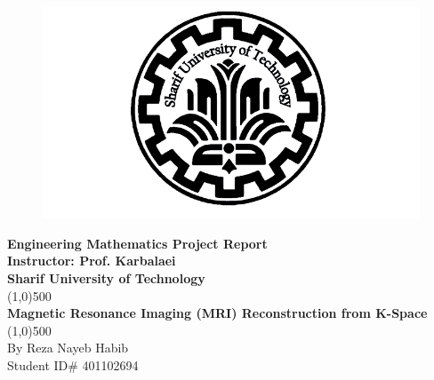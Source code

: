 \documentclass[11pt]{article}
\begin{document}
    
\begin{titlepage}
\begin{center}

\begin{figure}[H]
\begin{center}
\includegraphics[scale=0.4]{Fig/SUT.png}

\end{center}
\end{figure}

\huge{\textbf{Engineering Mathematics Project Report}} \\ 
\vspace*{2cm}
\Large{\textbf{Instructor: Prof. Karbalaei}} \\
\vspace*{1cm}
\huge{\textbf{Sharif University of Technology}} \\
\line(1,0){500} \\ 
\Huge{\textbf{Magnetic Resonance Imaging (MRI) Reconstruction from K-Space}} \\
\line(1,0){500} \\
\vfill
\Large{By Reza Nayeb Habib}\\
\Large{Student ID\# 401102694} \\

\end{center}
\end{titlepage}
\end{document}
